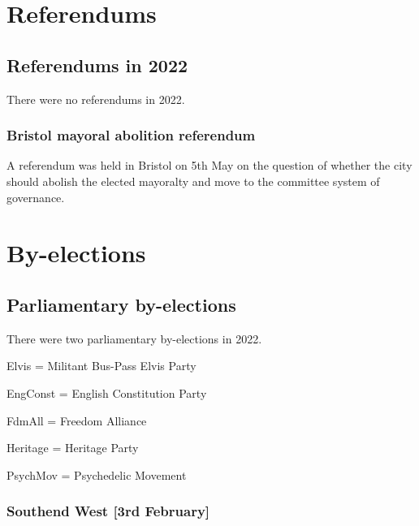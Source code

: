 \documentclass[a4paper,openany]{book}
\begin{document}



\part{Referendums}

\chapter{Referendums in 2022}

There were no referendums in 2022.

\section{Bristol mayoral abolition referendum}

A referendum was held in Bristol on 5th May on the question of whether the city should abolish the elected mayoralty and move to the committee system of governance.


\part{By-elections}

\chapter{Parliamentary by-elections}

There were two parliamentary by-elections in 2022.

%
%
Elvis = Militant Bus-Pass Elvis Party

EngConst = English Constitution Party

FdmAll = Freedom Alliance

Heritage = Heritage Party

PsychMov = Psychedelic Movement
%
%
%
%

\section*{Southend West \hspace*{\fill}\nolinebreak[1]%
	\enspace\hspace*{\fill}
	[3rd February]}
\end{document}
